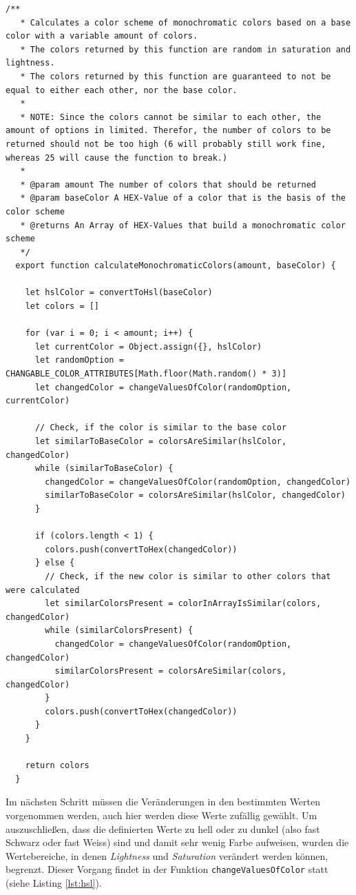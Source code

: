 \begin{lstlisting}[caption=Berechnung eines Monochromatischen Farbschemas, label=lst:mono]
  /**
   * Calculates a color scheme of monochromatic colors based on a base color with a variable amount of colors.
   * The colors returned by this function are random in saturation and lightness.
   * The colors returned by this function are guaranteed to not be equal to either each other, nor the base color.
   *
   * NOTE: Since the colors cannot be similar to each other, the amount of options in limited. Therefor, the number of colors to be returned should not be too high (6 will probably still work fine, whereas 25 will cause the function to break.)
   *
   * @param amount The number of colors that should be returned
   * @param baseColor A HEX-Value of a color that is the basis of the color scheme
   * @returns An Array of HEX-Values that build a monochromatic color scheme
   */
  export function calculateMonochromaticColors(amount, baseColor) {

    let hslColor = convertToHsl(baseColor)
    let colors = []

    for (var i = 0; i < amount; i++) {
      let currentColor = Object.assign({}, hslColor)
      let randomOption = CHANGABLE_COLOR_ATTRIBUTES[Math.floor(Math.random() * 3)]
      let changedColor = changeValuesOfColor(randomOption, currentColor)

      // Check, if the color is similar to the base color
      let similarToBaseColor = colorsAreSimilar(hslColor, changedColor)
      while (similarToBaseColor) {
        changedColor = changeValuesOfColor(randomOption, changedColor)
        similarToBaseColor = colorsAreSimilar(hslColor, changedColor)
      }

      if (colors.length < 1) {
        colors.push(convertToHex(changedColor))
      } else {
        // Check, if the new color is similar to other colors that were calculated
        let similarColorsPresent = colorInArrayIsSimilar(colors, changedColor)
        while (similarColorsPresent) {
          changedColor = changeValuesOfColor(randomOption, changedColor)
          similarColorsPresent = colorsAreSimilar(colors, changedColor)
        }
        colors.push(convertToHex(changedColor))
      }
    }

    return colors
  }
\end{lstlisting}

Im nächsten Schritt müssen die Veränderungen in den bestimmten Werten vorgenommen werden, auch hier werden diese Werte zufällig gewählt. Um auszuschließen, dass die definierten Werte zu hell oder zu dunkel (also fast Schwarz oder fast Weiss) sind und damit sehr wenig Farbe aufweisen, wurden die Wertebereiche, in denen \textit{Lightness} und \textit{Saturation} verändert werden können, begrenzt. Dieser Vorgang findet in der Funktion \verb|changeValuesOfColor| statt (siehe Listing \ref{lst:hsl}).

